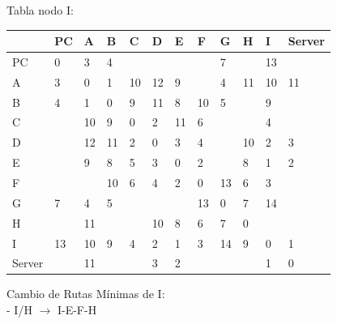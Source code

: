 \documentclass[a4paper]{article}
\begin{document}
\begin{table}[h]
Tabla nodo I:\\
\begin{tabular}{|l|l|l|l|l|l|l|l|l|l|l|l|}
\hline
       & PC & A  & B  & C  & D  & E  & F  & G  & H  & I  & Server \\ \hline
PC     & 0  & 3  & 4  &    &    &    &    & 7  &    & 13 &        \\ \hline
A      & 3  & 0  & 1  & 10 & 12 & 9  &    & 4  & 11 & 10 & 11     \\ \hline
B      & 4  & 1  & 0  & 9  & 11 & 8  & 10 & 5  &    & 9  &        \\ \hline
C      &    & 10 & 9  & 0  & 2  & 11 & 6  &    &    & 4  &        \\ \hline
D      &    & 12 & 11 & 2  & 0  & 3  & 4  &    & 10 & 2  & 3      \\ \hline
E      &    & 9  & 8  & 5  & 3  & 0  & 2  &    & 8  & 1  & 2      \\ \hline
F      &    &    & 10 & 6  & 4  & 2  & 0  & 13 & 6  & 3  &        \\ \hline
G      & 7  & 4  & 5  &    &    &    & 13 & 0  & 7  & 14 &        \\ \hline
H      &    & 11 &    &    & 10 & 8  & 6  & 7  & 0  &    &        \\ \hline
I      & 13 & 10 & 9  & 4  & 2  & 1  & 3  & 14 & 9  & 0  & 1      \\ \hline
Server &    & 11 &    &    & 3  & 2  &    &    &    & 1  & 0      \\ \hline
\end{tabular}

Cambio de Rutas Mínimas de I:\\
-	I/H  $\rightarrow$  I-E-F-H\\

\end{table}
\clearpage
\end{document}
